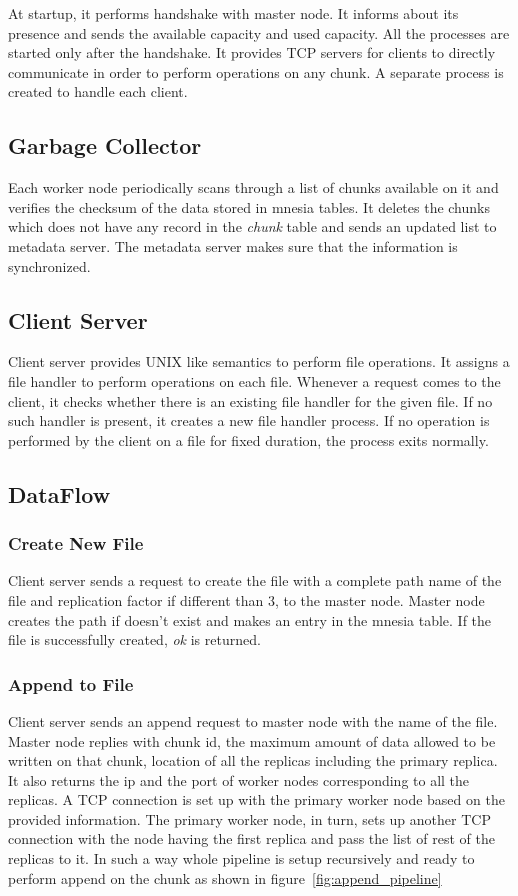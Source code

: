 \documentclass[a4paper,12pt]{article}
\begin{document}
At startup, it performs handshake with master node. It informs  about its presence and sends the available capacity and used capacity. All the processes are started only after the handshake. It provides TCP servers for clients to directly communicate in order to perform operations on any chunk. A separate process is created to handle each client.

\subsection{Garbage Collector}
Each worker node periodically scans through a list of chunks available on it and verifies the checksum of the data stored in mnesia tables. It deletes the chunks which does not have any record in the \textit{chunk} table and sends an updated list to metadata server. The metadata server makes sure that the information is synchronized.

\subsection{Client Server}
Client server provides UNIX like semantics to perform file operations. It assigns a file handler to perform operations on each file. Whenever a request comes to the client, it checks whether there is an existing file handler for the given file. If no such handler is present, it creates a new file handler process. If no operation is performed by the client on a file for fixed duration, the process exits normally.

\subsection{DataFlow}
\subsubsection{Create New File}
Client server sends a request to create the file with a complete path name of the file and replication factor if different than 3, to the master node. Master node creates the path if doesn't exist and makes an entry in the mnesia table. If the file is successfully created, \textit{ok} is returned.

\subsubsection{Append to File}
Client server sends an append request to master node with the name of the file. Master node replies with chunk id, the maximum amount of data allowed to be written on that chunk, location of all the replicas including the primary replica. It also returns the ip and the port of worker nodes corresponding to all the replicas. A TCP connection is set up with the primary worker node based on the provided information. The primary worker node, in turn, sets up another TCP connection with the node having the first replica and pass the list of rest of the replicas to it. In such a way whole pipeline is setup recursively and ready to perform append on the chunk as shown in figure~\ref{fig:append_pipeline}
\end{document}
